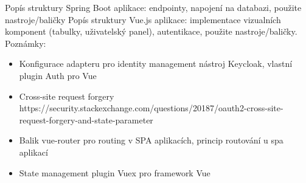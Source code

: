 \documentclass[12pt]{article}
\begin{document}
Popís struktury Spring Boot aplikace: endpointy, napojení na databazi, použite nastroje/baličky
Popís struktury Vue.js aplikace: implementace vizualních komponent 
(tabulky, uživatelský panel), autentikace, použite nastroje/baličky. 
\newline
\newline
Poznámky:
\begin{itemize}
    \item Konfigurace adapteru pro identity management nástroj Keycloak, vlastní plugin Auth pro Vue
    \item Cross-site request forgery https://security.stackexchange.com/questions/20187/oauth2-cross-site-request-forgery-and-state-parameter
    \item Balik vue-router pro routing v SPA aplikacích, princip routování u spa aplikací
    \item State management plugin Vuex pro framework Vue

\end{itemize}
\end{document}
